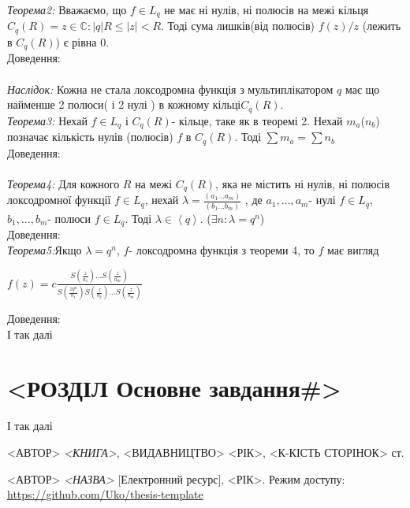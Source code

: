 \documentclass[12pt,a4paper]{article}
\begin{document}
\emph{Теорема2:} Вважаємо, що $f\in L_{q}$ не має ні нулів, ні полюсів на межі кільця $C_{q}(R)={z\in \mathbb{C}:\left |q  \right |R\leq \left |z  \right |<R }$. Тоді сума лишків(від полюсів) $f(z)/z$ (лежить в $C_{q}(R)$) є рівна $0$.\\
Доведення:\\
\\
\emph{Наслідок:} Кожна не стала локсодромна функція з мультиплікатором $q$ має що найменше 2 полюси( і 2 нулі ) в кожному кільці$C_{q}(R)$.\\
  
\emph{Теорема3:} Нехай $f\in L_{q}$ і $C_{q}(R)$- кільце, таке як в теоремі 2. Нехай $m_{a}$($n_{b}$) позначає кількість нулів (полюсів) $f$ в $C_{q}(R)$. Тоді $\sum m_{a}=\sum n_{b}$ \\
Доведення:\\
\\

\emph{Теорема4:} Для кожного $R$ на межі $C_{q}(R)$, яка не містить ні нулів, ні полюсів локсодромної функції $f\in L_{q}$, нехай $\lambda=\frac{(a_{1}...a_{m})}{(b_{1}...b_{m})}$ , де $a_{1},...,a_{m}$- нулі $f\in L_{q}$, $b_{1},...,b_{m}$- полюси $f\in L_{q}$. Тоді $\lambda\in \left \langle q \right \rangle$. ($ \exists n:\lambda =q^{n}$)\\
Доведення:
\\

\emph{Теорема5:}Якщо $\lambda =q^{n}$, $f$- локсодромна функція з теореми 4, то  $f$ має вигляд\\
 \begin{center}
 $f(z)= c\tfrac{S(\frac{z}{a_{1}})...S(\frac{z}{a_{m}})}{S(\frac{zq^{n}}{b_{1}})S(\frac{z}{b_{2}})...S(\frac{z}{b_{m}})}$
 \end{center}
Доведення:\\


І так далі\cite{web}

\clearpage
\section{<РОЗДІЛ Основне завдання\#>}



І так далі\cite{web}

\clearpage
{}
\begin{thebibliography}{9}

  <АВТОР> \emph{<КНИГА>},
    <ВИДАВНИЦТВО> <РІК>, <К-КІСТЬ СТОРІНОК> ст.
    
  <АВТОР> \emph{<НАЗВА>} [Електронний ресурс],
    <РІК>. Режим доступу:
    \url{https://github.com/Uko/thesis-template}

\end{thebibliography}
\end{document}
